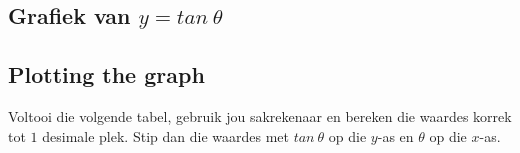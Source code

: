 \subsection{Grafiek van $y=tan~\theta $ }
\subsection*{Plotting the graph}
\nopagebreak
Voltooi die volgende tabel, gebruik jou sakrekenaar en bereken die waardes korrek tot $1$ desimale plek. Stip dan
die waardes met $tan~\theta $ op die $y$-as en $\theta $ op die $x$-as.\par 

\setlength\mytablespace{16\tabcolsep}
\addtolength\mytablespace{9\arrayrulewidth}
\setlength\mytablewidth{\linewidth}
\setlength\mytableroom{\mytablewidth}
\addtolength\mytableroom{-\mytablespace}
\setlength\myfixedwidth{0pt}
\setlength\mystarwidth{\mytableroom}
\addtolength\mystarwidth{-\myfixedwidth}
\divide{}

